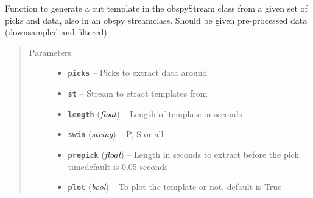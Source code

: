 \documentclass[a4paper,10pt,english]{sphinxmanual}
\begin{document}
\begin{fulllineitems}
\label{submodules/core.template_gen:template_gen._template_gen}
Function to generate a cut template in the obspyStream class from a given set of picks and data, also in an obspy streamclass.  Should be given pre-processed data (downsampled and filtered)
\begin{quote}\begin{description}
\item[{Parameters}] \leavevmode\begin{itemize}
\item {} 
\textbf{\texttt{picks}} -- Picks to extract data around

\item {} 
\textbf{\texttt{st}} -- Stream to etract templates from

\item {} 
\textbf{\texttt{length}} (\href{https://docs.python.org/library/functions.html\#float}{\emph{float}}) -- Length of template in seconds

\item {} 
\textbf{\texttt{swin}} (\href{https://docs.python.org/library/string.html\#module-string}{\emph{string}}) -- P, S or all

\item {} 
\textbf{\texttt{prepick}} (\href{https://docs.python.org/library/functions.html\#float}{\emph{float}}) -- Length in seconds to extract before the pick timedefault is 0.05 seconds

\item {} 
\textbf{\texttt{plot}} (\href{https://docs.python.org/library/functions.html\#bool}{\emph{bool}}) -- To plot the template or not, default is True

\end{itemize}

\end{description}\end{quote}

\end{fulllineitems}

\end{document}
